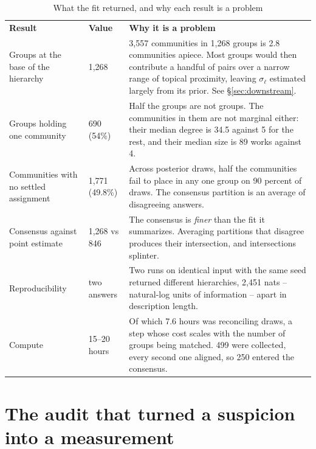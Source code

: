\documentclass[11pt]{article}
\newcommand{\doublerule}{%
  \specialrule{0.5pt}{-1pt}{1pt}%
  \specialrule{0.5pt}{0pt}{1pt}}
\begin{document}
\begin{table}[!t]
\centering
\setlength{\tabcolsep}{4.5pt}
\caption{What the fit returned, and why each result is a problem}
\label{tab:symptoms}
\begin{tabular}{@{}P{3.6cm}P{3.2cm}P{7.4cm}@{}}
\toprule
\textbf{Result} & \textbf{Value} & \textbf{Why it is a problem}\\
\doublerule
Groups at the base of the hierarchy
  & 1{,}268
  & 3{,}557 communities in 1{,}268 groups is 2.8 communities apiece. Most
    groups would then contribute a handful of pairs over a narrow range of
    topical proximity, leaving $\sigma_{\ell}$ estimated largely from its
    prior. See \S\ref{sec:downstream}.\\
Groups holding one community
  & 690 (54\%)
  & Half the groups are not groups. The communities in them are not marginal
    either: their median degree is 34.5 against 5 for the rest, and their median
    size is 89 works against 4.\\
Communities with no settled assignment
  & 1{,}771 (49.8\%)
  & Across posterior draws, half the communities fail to place in any one group
    on 90 percent of draws. The consensus partition is an average of
    disagreeing answers.\\
Consensus against point estimate
  & 1{,}268 vs 846
  & The consensus is \emph{finer} than the fit it summarizes. Averaging
    partitions that disagree produces their intersection, and intersections
    splinter.\\
Reproducibility
  & two answers
  & Two runs on identical input with the same seed returned different
    hierarchies, 2{,}451 nats -- natural-log units of information -- apart in
    description length.\\
Compute
  & 15--20 hours
  & Of which 7.6 hours was reconciling draws, a step whose cost scales with
    the number of groups being matched. 499 were collected, every second one
    aligned, so 250 entered the consensus.\\
\bottomrule
\end{tabular}
\end{table}

\section{The audit that turned a suspicion into a measurement}
\label{sec:audit}
\end{document}
